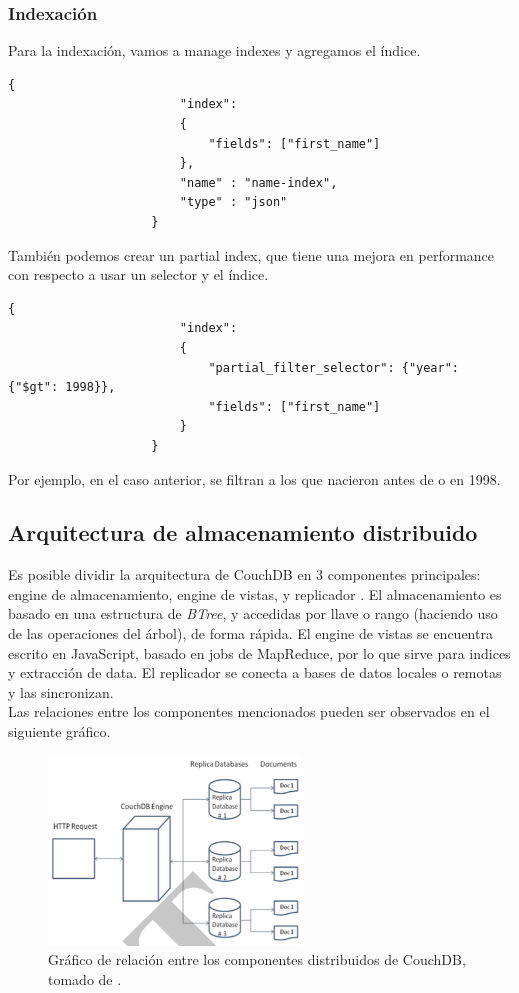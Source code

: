 \documentclass{article}
\begin{document}
            \subsubsection{Indexación}
                Para la indexación, vamos a manage indexes y agregamos el índice. 
                \begin{lstlisting}[gobble = 20]
                    {
                        "index": 
                        {
                            "fields": ["first_name"]
                        },
                        "name" : "name-index",
                        "type" : "json"
                    }
                \end{lstlisting}
                También podemos crear un partial index, que tiene una mejora en performance con respecto a usar un selector y el índice.
                \begin{lstlisting}[gobble = 20]
                    {
                        "index": 
                        {
                            "partial_filter_selector": {"year": {"$gt": 1998}},
                            "fields": ["first_name"]
                        }
                    } 
                \end{lstlisting} 
                Por ejemplo, en el caso anterior, se filtran a los que nacieron antes de o en 1998.
        \subsection{Arquitectura de almacenamiento distribuido}
            Es posible dividir la arquitectura de CouchDB en 3 componentes principales: engine de almacenamiento, engine de vistas, y replicador \cite{padhy}. El almacenamiento es basado en una estructura de \textit{BTree}, y accedidas por llave o rango (haciendo uso de las operaciones del árbol), de forma rápida. El engine de vistas se encuentra escrito en JavaScript, basado en jobs de MapReduce, por lo que sirve para indices y extracción de data. El replicador se conecta a bases de datos locales o remotas y las sincronizan. \\
            Las relaciones entre los componentes mencionados pueden ser observados en el siguiente gráfico. \\
            \begin{figure}[h]
                \caption{Gráfico de relación entre los componentes distribuidos de CouchDB, tomado de \cite{padhy}.}
                \includegraphics[width = 0.6\textwidth]{architecture.png}
            \end{figure}
\end{document}

